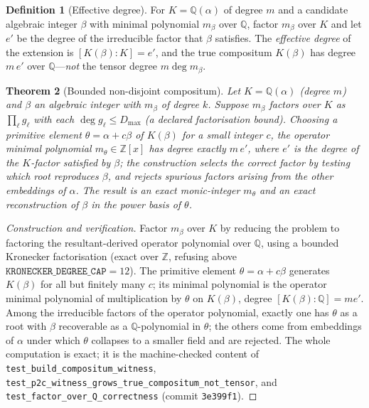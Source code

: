 \documentclass[11pt]{article}
\theoremstyle{plain}
\newtheorem{theorem}{Theorem}[section]
\theoremstyle{definition}
\newtheorem{definition}[theorem]{Definition}
\theoremstyle{remark}
\newcommand{\Q}{\mathbb{Q}}
\newcommand{\Z}{\mathbb{Z}}
\newcommand{\K}{K}
\begin{document}
\begin{definition}[Effective degree]\label{def:effdeg}
For $\K=\Q(\alpha)$ of degree $m$ and a candidate algebraic integer $\beta$ with minimal polynomial $m_\beta$
over $\Q$, factor $m_\beta$ over $\K$ and let $e'$ be the degree of the irreducible factor that $\beta$
satisfies. The \emph{effective degree} of the extension is $[\K(\beta):\K]=e'$, and the true compositum
$\K(\beta)$ has degree $m\,e'$ over $\Q$---\emph{not} the tensor degree $m\deg m_\beta$.
\end{definition}

\begin{theorem}[Bounded non-disjoint compositum]\label{thm:nondisjoint}
Let $\K=\Q(\alpha)$ (degree $m$) and $\beta$ an algebraic integer with $m_\beta$ of degree $k$. Suppose
$m_\beta$ factors over $\K$ as $\prod_\ell g_\ell$ with each $\deg g_\ell\le D_{\max}$ (a declared
factorisation bound). Choosing a primitive element $\theta=\alpha+c\beta$ of $\K(\beta)$ for a small integer
$c$, the operator minimal polynomial $m_\theta\in\Z[x]$ has degree exactly $m\,e'$, where $e'$ is the degree
of the $\K$-factor satisfied by $\beta$; the construction selects the correct factor by testing which root
reproduces $\beta$, and rejects spurious factors arising from the other embeddings of $\alpha$. The result is
an exact monic-integer $m_\theta$ and an exact reconstruction of $\beta$ in the power basis of $\theta$.
\end{theorem}

\begin{proof}[Construction and verification]
Factor $m_\beta$ over $\K$ by reducing the problem to factoring the resultant-derived operator polynomial over
$\Q$, using a bounded Kronecker factorisation (exact over $\Z$, refusing above
$\texttt{KRONECKER\_DEGREE\_CAP}=12$). The primitive element $\theta=\alpha+c\beta$ generates $\K(\beta)$ for
all but finitely many $c$; its minimal polynomial is the operator minimal polynomial of multiplication by
$\theta$ on $\K(\beta)$, degree $[\K(\beta):\Q]=m e'$. Among the irreducible factors of the operator
polynomial, exactly one has $\theta$ as a root with $\beta$ recoverable as a $\Q$-polynomial in $\theta$; the
others come from embeddings of $\alpha$ under which $\theta$ collapses to a smaller field and are rejected.
The whole computation is exact; it is the machine-checked content of
\texttt{test\_build\_compositum\_witness}, \texttt{test\_p2c\_witness\_grows\_true\_compositum\_not\_tensor},
and \texttt{test\_factor\_over\_Q\_correctness} (commit \texttt{3e399f1}).
\end{proof}
\end{document}
